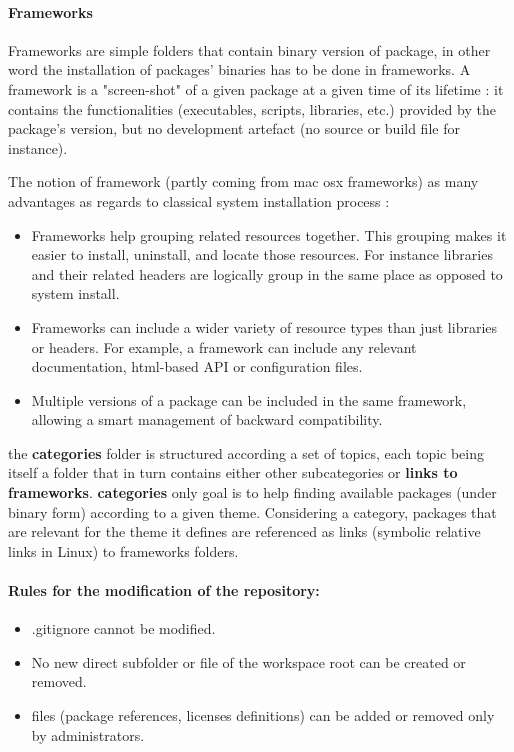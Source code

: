 \documentclass[12pt,a4paper]{article}
\begin{document}
\paragraph*{Frameworks} 
Frameworks are simple folders that contain binary version of package, in other word the installation of packages' binaries has to be done in frameworks. A framework is a "screen-shot" of a given package at a given time of its lifetime : it contains the functionalities (executables, scripts, libraries, etc.) provided by the package's version, but no development artefact (no source or build file for instance).

The notion of framework (partly coming from mac osx frameworks) as many advantages as regards to classical system installation process :
\begin{itemize}
\item Frameworks help grouping related resources together. This grouping makes it easier to install, uninstall, and locate those resources. For instance libraries and their related headers are logically group in the same place as opposed to system install.
\item Frameworks can include a wider variety of resource types than just libraries or headers. For example, a framework can include any relevant documentation, html-based API or configuration files.
\item Multiple versions of a package can be included in the same framework, allowing a smart management of backward compatibility.
\end{itemize}

the \textbf{categories} folder is structured according a set of topics, each topic being itself a folder that in turn contains either other subcategories or \textbf{links to frameworks}. \textbf{categories} only goal is to help finding available packages (under binary form) according to a given theme. Considering a category, packages that are relevant for the theme it defines are referenced as links (symbolic relative links in Linux) to frameworks folders.


\paragraph{Rules for the modification of the repository:}
\begin{itemize}
\item .gitignore cannot be modified.
\item No new direct subfolder or file of the workspace root can be created or removed.
\item files (package references, licenses definitions) can be added or removed only by administrators.
\end{itemize}
\end{document}
